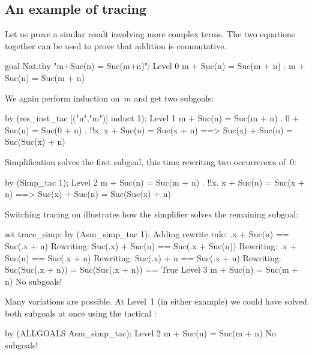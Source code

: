 \subsection{An example of tracing}
Let us prove a similar result involving more complex terms.  The two
equations together can be used to prove that addition is commutative.
\begin{ttbox}
goal Nat.thy "m+Suc(n) = Suc(m+n)";
{\out Level 0}
{\out m + Suc(n) = Suc(m + n)}
{. m + Suc(n) = Suc(m + n)}
\end{ttbox}
We again perform induction on~$m$ and get two subgoals:
\begin{ttbox}
by (res_inst_tac [("n","m")] induct 1);
{\out Level 1}
{\out m + Suc(n) = Suc(m + n)}
{. 0 + Suc(n) = Suc(0 + n)}
{. !!x. x + Suc(n) = Suc(x + n) ==>}
{\out          Suc(x) + Suc(n) = Suc(Suc(x) + n)}
\end{ttbox}
Simplification solves the first subgoal, this time rewriting two
occurrences of~0:
\begin{ttbox}
by (Simp_tac 1);
{\out Level 2}
{\out m + Suc(n) = Suc(m + n)}
{. !!x. x + Suc(n) = Suc(x + n) ==>}
{\out          Suc(x) + Suc(n) = Suc(Suc(x) + n)}
\end{ttbox}
Switching tracing on illustrates how the simplifier solves the remaining
subgoal: 
\begin{ttbox}
set trace_simp;
by (Asm_simp_tac 1);
\ttbreak
{\out Adding rewrite rule:}
{\out .x + Suc(n) == Suc(.x + n)}
\ttbreak
{\out Rewriting:}
{\out Suc(.x) + Suc(n) == Suc(.x + Suc(n))}
\ttbreak
{\out Rewriting:}
{\out .x + Suc(n) == Suc(.x + n)}
\ttbreak
{\out Rewriting:}
{\out Suc(.x) + n == Suc(.x + n)}
\ttbreak
{\out Rewriting:}
{\out Suc(Suc(.x + n)) = Suc(Suc(.x + n)) == True}
\ttbreak
{\out Level 3}
{\out m + Suc(n) = Suc(m + n)}
{\out No subgoals!}
\end{ttbox}
Many variations are possible.  At Level~1 (in either example) we could have
solved both subgoals at once using the tactical :
\begin{ttbox}
by (ALLGOALS Asm_simp_tac);
{\out Level 2}
{\out m + Suc(n) = Suc(m + n)}
{\out No subgoals!}
\end{ttbox}

